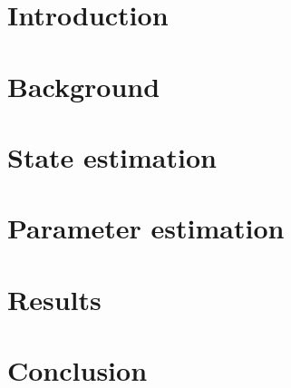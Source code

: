 \documentclass[english,12pt,a4paper]{article}
\theoremstyle{definition}
\begin{document}
\captionsetup{subrefformat=parens}%
%
%
%
\makecoverpage%
%
%
%
%
%
%
\newpage%
%
%
%
\tableofcontents%
%
%
%




\cleardoublepage
\storeinipagenumber
{}
\setcounter{page}{1}

\begin{onehalfspace}
\section{Introduction}\label{sec:intro}



\thispagestyle{empty}


\clearpage

\section{Background}\label{sec:background}

\clearpage


\section{State estimation}\label{sec:state_est}

\clearpage

\section{Parameter estimation}\label{sec:param_est}

\clearpage

\section{Results}\label{sec:results}

\clearpage

\section{Conclusion}\label{sec:conclusion}

\clearpage

\listoftodos
\clearpage
\appendix
{}

\clearpage
\printbibliography
\end{onehalfspace}
\end{document}
